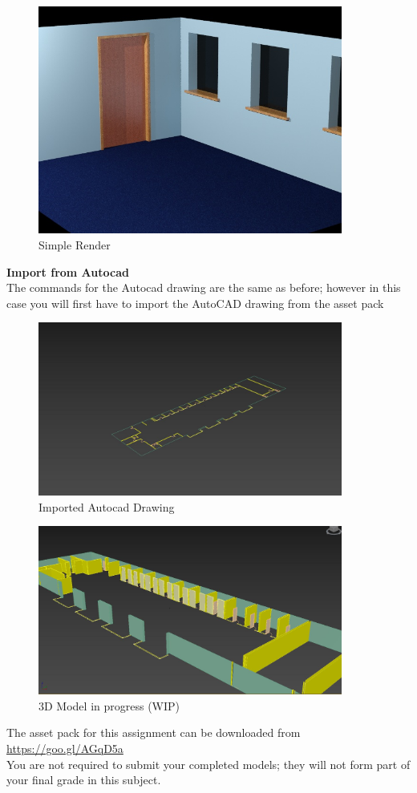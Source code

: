 \vspace{1cm}
\begin{figure}[ht]
	\centering
		\includegraphics[width=10cm]{./img/SimpleRender.jpg}
		\caption{Simple Render}
	\label{fig:Simplerender}
\end{figure}

\newpage

\textbf{Import from Autocad}\\
The commands for the Autocad drawing are the same as before; however in this case you will first have to import the AutoCAD drawing from the asset pack

\begin{figure}[hb]
	\centering
		\includegraphics[width=10cm]{./img/DwgImported.jpg}
		\caption{Imported Autocad Drawing}
	\label{fig:DwgImported}
\end{figure}


\begin{figure}[hb]
	\centering
		\includegraphics[width=10cm]{./img/DwgWIP.jpg}
		\caption{3D Model in progress (WIP)}
	\label{fig:DwgWIP}
\end{figure}





The asset pack for this assignment can be downloaded from \href{https://goo.gl/AGqD5a}{https://goo.gl/AGqD5a}\\

You are not required to submit your completed models; they will not form part of your final grade in this subject.\\

